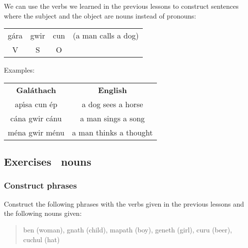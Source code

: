 We can use the verbs we learned in the previous lessons to construct sentences where the subject and the object are nouns instead of pronouns:
\begin{table}[H]
\begin{tabular}{cccc}
  g\'{a}ra & gwir & cun & (a man calls a dog)\\
  V & S & O &
\end{tabular}
\label{examples_vso}
\end{table}

Examples:
\begin{table}[H]
\centering
\begin{tabular}{cc}
  \toprule
  \textbf{Gal\'{a}thach} & \textbf{English}\\
  \cmidrule(lr){1-1}\cmidrule(lr){2-2}
  ap\'{\i}sa cun \'{e}p & a dog sees a horse\\
  c\'{a}na gwir c\'{a}nu & a man sings a song\\
  m\'{e}na gwir m\'{e}nu & a man thinks a thought\\
  \bottomrule
\end{tabular}
\label{examples_vso_more_examples}
\end{table}

\newpage
\subsection{Exercises \textendash\ nouns}

\subsubsection{Construct phrases}

Construct the following phrases with the verbs given in the previous lessons and the following nouns given:

\begin{quote}
ben (woman), gnath (child), mapath (boy), geneth (girl), curu (beer), cuchul (hat)
\end{quote}

